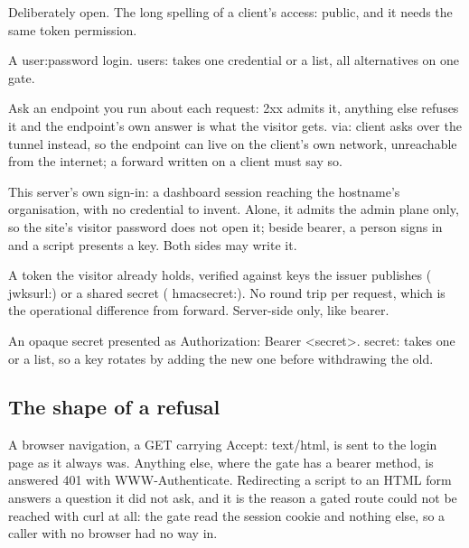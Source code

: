 \documentclass[11pt,a4paper,oneside]{book}
\newcommand{\aperiobreakableunderscore}{\textunderscore\allowbreak}
\newcommand{\aperiocodebreaks}{\XeTeXinterchartokenstate=1 }
\newcommand{\aperiocodebreaks}{}
\DeclareRobustCommand{\code}[1]{{\ttfamily\small\aperiocodebreaks
  \let\_\aperiobreakableunderscore#1}}
\begin{document}
\begin{description}[leftmargin=1.6em,style=nextline]
  \item[\code{none}] Deliberately open. The long spelling of a client's
        \code{access: public}, and it needs the same token permission.
  \item[\code{basic}] A \code{user:password} login. \code{users:} takes
        one credential or a list, all alternatives on one gate.
  \item[\code{forward}] Ask an endpoint you run about each request:
        \code{2xx} admits it, anything else refuses it and the endpoint's
        own answer is what the visitor gets.
        \code{via: client} asks over the tunnel instead, so the endpoint
        can live on the client's own network, unreachable from the internet;
        a \code{forward} written on a client must say so.
  \item[\code{aperio}] This server's own sign-in: a dashboard session
        reaching the hostname's organisation, with no credential to invent.
        Alone, it admits the admin plane only, so the site's visitor
        password does not open it; beside \code{bearer}, a person signs in
        and a script presents a key. Both sides may write it.
  \item[\code{jwt}] A token the visitor already holds, verified against
        keys the issuer publishes (\code{jwks\_url:}) or a shared secret
        (\code{hmac\_secret:}). No round trip per request, which is the
        operational difference from \code{forward}. Server-side
        only, like \code{bearer}.
  \item[\code{bearer}] An opaque secret presented as
        \code{Authorization: Bearer <secret>}. \code{secret:} takes one
        or a list, so a key rotates by adding the new one before
        withdrawing the old.
\end{description}

\subsection{The shape of a refusal}

A browser navigation, a \code{GET} carrying \code{Accept: text/html}, is
sent to the login page as it always was. Anything else, where the gate
has a \code{bearer} method, is answered \code{401} with
\code{WWW-Authenticate}. Redirecting a script to an HTML form answers a
question it did not ask, and it is the reason a gated route could not be
reached with \code{curl} at all: the gate read the session cookie and
nothing else, so a caller with no browser had no way in.
\end{document}

